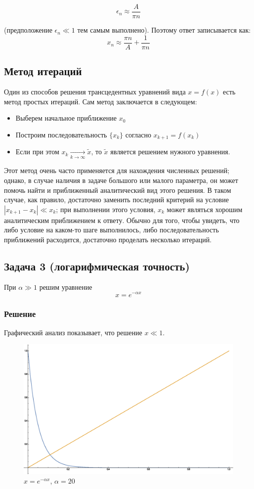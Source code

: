 \documentclass[a4paper,12pt]{article}
\begin{document}
\[
\epsilon_{n}\approx\frac{A}{\pi n}
\]

\noindent
(предположение $\epsilon_{n}\ll1$ тем самым выполнено). Поэтому ответ
записывается как:
\[
x_{n}\approx\frac{\pi n}{A}+\frac{1}{\pi n}
\]

\subsection{Метод итераций}

Один из способов решения трансцедентных уравнений вида $x=f(x)$ есть
метод простых итераций. Сам метод заключается в следующем:
\begin{itemize}
	\item Выберем начальное приближение $x_{0}$
	\item Построим последовательность $\{x_{k}\}$ согласно $x_{k+1}=f(x_{k})$
	\item Если при этом $x_{k}\underset{k\to\infty}{\to}\widetilde{x}$, то
	$\widetilde{x}$ является решением нужного уравнения.
\end{itemize}
Этот метод очень часто применяется для нахождения численных решений;
однако, в случае наличия в задаче большого или малого параметра, он
может помочь найти и приближенный аналитический вид этого решения.
В таком случае, как правило, достаточно заменить последний критерий
на условие $\left|x_{k+1}-x_{k}\right|\ll x_{k}$; при выполнении
этого условия, $x_{k}$ может являться хорошим аналитическим приближением
к ответу. Обычно для того, чтобы увидеть, что либо условие на каком-то шаге выполнилось, либо последовательность приближений расходится, достаточно проделать несколько итераций.


\subsection{Задача 3 (логарифмическая точность)}

При $\alpha\gg 1$ решим уравнение 
\[
x=e^{-\alpha x}
\]

\subsubsection{Решение}

\noindent
Графический анализ показывает, что решение $x\ll1$.

\begin{figure}[h]
	\caption{$x=e^{-\alpha x}$, $\alpha=20$}
	\centering
	\includegraphics[width=0.65\columnwidth]{plotexp.eps}
\end{figure}
\end{document}
